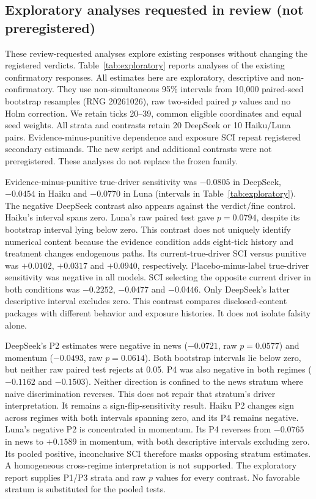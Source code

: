 \documentclass[a4paper]{article}
\begin{document}
\subsection{Exploratory analyses requested in review (not preregistered)}\label{sec:exploratory}
These review-requested analyses explore existing responses without changing the registered verdicts. Table~\ref{tab:exploratory} reports analyses of the existing confirmatory responses. All estimates here are exploratory, descriptive and non-confirmatory. They use non-simultaneous 95\% intervals from 10,000 paired-seed bootstrap resamples (RNG 20261026), raw two-sided paired $p$ values and no Holm correction. We retain ticks 20--39, common eligible coordinates and equal seed weights. All strata and contrasts retain 20 DeepSeek or 10 Haiku/Luna pairs. Evidence-minus-punitive dependence and exposure SCI repeat registered secondary estimands. The new script and additional contrasts were not preregistered. These analyses do not replace the frozen family.

Evidence-minus-punitive true-driver sensitivity was $-0.0805$ in DeepSeek, $-0.0454$ in Haiku and $-0.0770$ in Luna (intervals in Table~\ref{tab:exploratory}). The negative DeepSeek contrast also appears against the verdict/fine control. Haiku's interval spans zero. Luna's raw paired test gave $p=0.0794$, despite its bootstrap interval lying below zero. This contrast does not uniquely identify numerical content because the evidence condition adds eight-tick history and treatment changes endogenous paths. Its current-true-driver SCI versus punitive was $+0.0102$, $+0.0317$ and $+0.0940$, respectively. Placebo-minus-label true-driver sensitivity was negative in all models. SCI selecting the opposite current driver in both conditions was $-0.2252$, $-0.0477$ and $-0.0446$. Only DeepSeek's latter descriptive interval excludes zero. This contrast compares disclosed-content packages with different behavior and exposure histories. It does not isolate falsity alone.

DeepSeek's P2 estimates were negative in news ($-0.0721$, raw $p=0.0577$) and momentum ($-0.0493$, raw $p=0.0614$). Both bootstrap intervals lie below zero, but neither raw paired test rejects at 0.05. P4 was also negative in both regimes ($-0.1162$ and $-0.1503$). Neither direction is confined to the news stratum where naive discrimination reverses. This does not repair that stratum's driver interpretation. It remains a sign-flip-sensitivity result. Haiku P2 changes sign across regimes with both intervals spanning zero, and its P4 remains negative. Luna's negative P2 is concentrated in momentum. Its P4 reverses from $-0.0765$ in news to $+0.1589$ in momentum, with both descriptive intervals excluding zero. Its pooled positive, inconclusive SCI therefore masks opposing stratum estimates. A homogeneous cross-regime interpretation is not supported. The exploratory report supplies P1/P3 strata and raw $p$ values for every contrast. No favorable stratum is substituted for the pooled tests.
\end{document}
